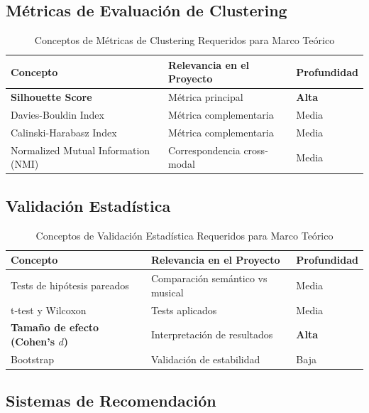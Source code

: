 \subsection{Métricas de Evaluación de Clustering}

\begin{table}[htbp]
\centering
\caption{Conceptos de Métricas de Clustering Requeridos para Marco Teórico}
\label{tab:conceptos-metricas-clustering}
\begin{tabular}{lll}
\toprule
\textbf{Concepto} & \textbf{Relevancia en el Proyecto} & \textbf{Profundidad} \\
\midrule
\textbf{Silhouette Score} & Métrica principal & \textbf{Alta} \\
Davies-Bouldin Index & Métrica complementaria & Media \\
Calinski-Harabasz Index & Métrica complementaria & Media \\
Normalized Mutual Information (NMI) & Correspondencia cross-modal & Media \\
\bottomrule
\end{tabular}
\end{table}

\subsection{Validación Estadística}

\begin{table}[htbp]
\centering
\caption{Conceptos de Validación Estadística Requeridos para Marco Teórico}
\label{tab:conceptos-estadistica}
\begin{tabular}{lll}
\toprule
\textbf{Concepto} & \textbf{Relevancia en el Proyecto} & \textbf{Profundidad} \\
\midrule
Tests de hipótesis pareados & Comparación semántico vs musical & Media \\
t-test y Wilcoxon & Tests aplicados & Media \\
\textbf{Tamaño de efecto (Cohen's $d$)} & Interpretación de resultados & \textbf{Alta} \\
Bootstrap & Validación de estabilidad & Baja \\
\bottomrule
\end{tabular}
\end{table}

\subsection{Sistemas de Recomendación}

